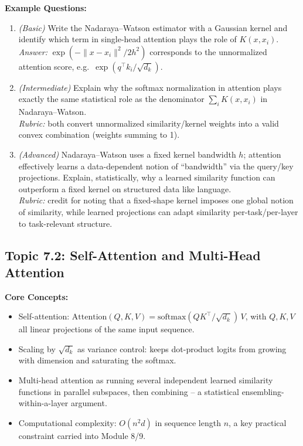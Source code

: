 \documentclass[11pt]{article}
\begin{document}
\textbf{Example Questions:}
\begin{enumerate}
  \item \textit{(Basic)} Write the Nadaraya--Watson estimator with a Gaussian kernel and identify which term in single-head attention plays the role of $K(x, x_i)$. \\
  \textit{Answer:} $\exp(-\|x-x_i\|^2/2h^2)$ corresponds to the unnormalized attention score, e.g.\ $\exp(q^\top k_i/\sqrt{d_k})$.
  \item \textit{(Intermediate)} Explain why the softmax normalization in attention plays exactly the same statistical role as the denominator $\sum_i K(x,x_i)$ in Nadaraya--Watson. \\
  \textit{Rubric:} both convert unnormalized similarity/kernel weights into a valid convex combination (weights summing to 1).
  \item \textit{(Advanced)} Nadaraya--Watson uses a fixed kernel bandwidth $h$; attention effectively learns a data-dependent notion of ``bandwidth'' via the query/key projections. Explain, statistically, why a learned similarity function can outperform a fixed kernel on structured data like language. \\
  \textit{Rubric:} credit for noting that a fixed-shape kernel imposes one global notion of similarity, while learned projections can adapt similarity per-task/per-layer to task-relevant structure.
\end{enumerate}

\subsection{Topic 7.2: Self-Attention and Multi-Head Attention}

\textbf{Core Concepts:}
\begin{itemize}
  \item Self-attention: $\text{Attention}(Q,K,V) = \text{softmax}(QK^\top/\sqrt{d_k})\,V$, with $Q,K,V$ all linear projections of the same input sequence.
  \item Scaling by $\sqrt{d_k}$ as variance control: keeps dot-product logits from growing with dimension and saturating the softmax.
  \item Multi-head attention as running several independent learned similarity functions in parallel subspaces, then combining -- a statistical ensembling-within-a-layer argument.
  \item Computational complexity: $O(n^2 d)$ in sequence length $n$, a key practical constraint carried into Module 8/9.
\end{itemize}
\end{document}

